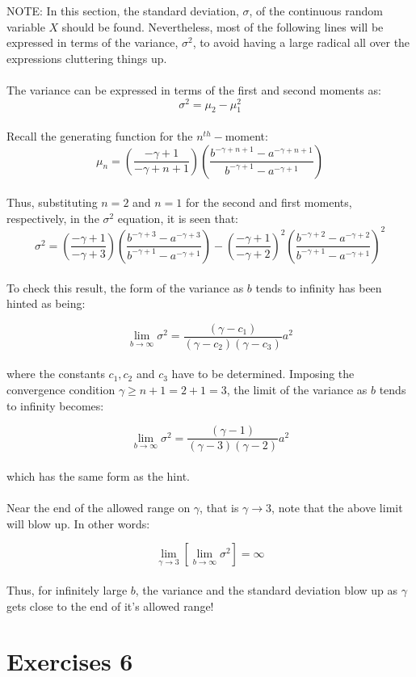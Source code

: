 \documentclass{article}
\begin{document}
NOTE: In this section, the standard deviation, $\sigma$, of the continuous random variable $X$ should be found. Nevertheless, most of the following lines will be expressed in terms of the variance, $\sigma^2$, to avoid having a large radical all over the expressions cluttering things up.\\
\\
The variance can be expressed in terms of the first and second moments as:
\[ \sigma^2 = \mu_2 - \mu_1^{2}\]
\\
Recall the generating function for the $n^{th}-$moment:
\[ \mu_n = (\frac{-\gamma+1}{-\gamma+n+1}) (  \frac{b^{-\gamma+n+1} - a^{-\gamma+n+1}}{b^{-\gamma+1} - a^{-\gamma+1}}    ) \]
\\
Thus, substituting $n=2$ and $n=1$ for the second and first moments, respectively, in the $\sigma^2$ equation, it is seen that:
\[ \sigma^2 = (\frac{-\gamma+1}{-\gamma+3}) (  \frac{b^{-\gamma+3} - a^{-\gamma+3}}{b^{-\gamma+1} - a^{-\gamma+1}}    ) - (\frac{-\gamma+1}{-\gamma+2})^2 (  \frac{b^{-\gamma+2} - a^{-\gamma+2}}{b^{-\gamma+1} - a^{-\gamma+1}}    )^2\]
\\
To check this result, the form of the variance as $b$ tends to infinity has been hinted as being:

\[ \lim_{b\to\infty} \sigma^2 = \frac{(\gamma-c_1)}{(\gamma-c_2)(\gamma-c_3)} a^2\]
\\
where the constants $c_1,c_2$ and $c_3$ have to be determined. Imposing the convergence condition $\gamma \geq n+1 = 2  + 1 = 3$, the limit of the variance as $b$ tends to infinity becomes:

\[ \lim_{b\to\infty} \sigma^2 = \frac{(\gamma-1)}{(\gamma-3)(\gamma-2)} a^2 \]
\\
which has the same form as the hint. \\
\\
Near the end of the allowed range on $\gamma$, that is $\gamma \to 3$, note that the above limit will blow up. In other words:

\[ \lim_{\gamma\to 3} \left [ \lim_{b\to \infty} \sigma ^2 \right ] = \infty \]
\\
Thus, for infinitely large $b$, the variance and the standard deviation blow up as $\gamma$ gets close to the end of it's allowed range!

\section{Exercises 6}
\end{document}

